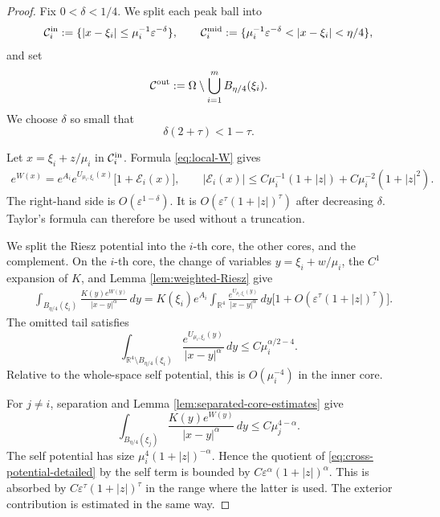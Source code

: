 \documentclass[11pt]{article}
\numberwithin{equation}{section}
\begin{document}
\begin{proof}
Fix $0<\delta<1/4$. We split each peak ball into
\[
\mathcal C_i^{\rm in}:=
\{|x-\xi_i|\leq\mu_i^{-1}\varepsilon^{-\delta}\},
\qquad
\mathcal C_i^{\rm mid}:=
\{\mu_i^{-1}\varepsilon^{-\delta}<|x-\xi_i|<\eta/4\},
\]
and set
\[
\mathcal C^{\rm out}:=
\Omega\setminus\bigcup_{i=1}^{m}B_{\eta/4}(\xi_i).
\]
We choose $\delta$ so small that
\[
\delta(2+\tau)<1-\tau.
\]

Let $x=\xi_i+z/\mu_i$ in $\mathcal C_i^{\rm in}$. Formula \eqref{eq:local-W} gives
\begin{equation}\label{eq:core-exponential-expansion}
\begin{aligned}
e^{W(x)}
=e^{A_i}e^{U_{\mu_i,\xi_i}(x)}
\bigl[1+\mathcal E_i(x)\bigr],
\qquad
|\mathcal E_i(x)|
\leq C\mu_i^{-1}(1+|z|)+C\mu_i^{-2}(1+|z|^2).
\end{aligned}
\end{equation}
The right-hand side is $O(\varepsilon^{1-\delta})$. It is $O(\varepsilon^\tau(1+|z|)^\tau)$ after decreasing $\delta$. Taylor's formula can therefore be used without a truncation.

We split the Riesz potential into the $i$-th core, the other cores, and the complement. On the $i$-th core, the change of variables $y=\xi_i+w/\mu_i$, the $C^1$ expansion of $K$, and Lemma \ref{lem:weighted-Riesz} give
\begin{equation}\label{eq:self-potential-detailed}
\begin{aligned}
&\int_{B_{\eta/4}(\xi_i)}
\frac{K(y)e^{W(y)}}{|x-y|^\alpha}\,dy=K(\xi_i)e^{A_i}
\int_{\mathbb R^4}
\frac{e^{U_{\mu_i,\xi_i}(y)}}{|x-y|^\alpha}\,dy
\bigl[1+O(\varepsilon^\tau(1+|z|)^\tau)\bigr].
\end{aligned}
\end{equation}
The omitted tail satisfies
\[
\int_{\mathbb R^4\setminus B_{\eta/4}(\xi_i)}
\frac{e^{U_{\mu_i,\xi_i}(y)}}{|x-y|^\alpha}\,dy
\leq C\mu_i^{\alpha/2-4}.
\]
Relative to the whole-space self potential, this is $O(\mu_i^{-4})$ in the inner core.

For $j\ne i$, separation and Lemma \ref{lem:separated-core-estimates} give
\begin{equation}\label{eq:cross-potential-detailed}
\int_{B_{\eta/4}(\xi_j)}
\frac{K(y)e^{W(y)}}{|x-y|^\alpha}\,dy
\leq C\mu_j^{4-\alpha}.
\end{equation}
The self potential has size
$\mu_i^4(1+|z|)^{-\alpha}$. Hence the quotient of \eqref{eq:cross-potential-detailed} by the self term is bounded by
$C\varepsilon^\alpha(1+|z|)^\alpha$. This is absorbed by
$C\varepsilon^\tau(1+|z|)^\tau$ in the range where the latter is used. The exterior contribution is estimated in the same way.


\end{proof}
\end{document}
